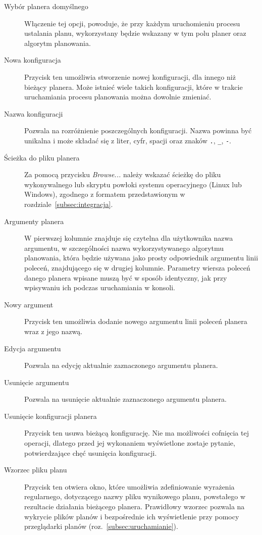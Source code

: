 {
\setcounter{desccount}{1}
\renewcommand{\descriptionlabel}[1]%
{\protect\circled{\arabic{desccount}} \hspace\labelsep\normalfont\bfseries #1\stepcounter{desccount}}

\begin{description}
\item[Wybór planera domyślnego] Włączenie tej opcji, powoduje, że przy każdym uruchomieniu procesu ustalania planu, wykorzystany będzie wskazany w tym polu planer oraz algorytm planowania.
\item [Nowa konfiguracja] Przycisk ten umożliwia stworzenie nowej konfiguracji, dla innego niż bieżący planera. Może istnieć wiele takich konfiguracji, które w trakcie uruchamiania procesu planowania można dowolnie zmieniać.
\item [Nazwa konfiguracji] Pozwala na rozróżnienie poszczególnych konfiguracji. Nazwa powinna być unikalna i może składać się z liter, cyfr, spacji oraz znaków \texttt{.}, \texttt{\_}, \texttt{-}.
\item [Ścieżka do pliku planera] Za pomocą przycisku \emph{Browse...} należy wskazać ścieżkę do pliku wykonywalnego lub skryptu powłoki systemu operacyjnego (Linux lub Windows), zgodnego z formatem przedstawionym w rozdziale~\ref{subsec:integracja}.
\item [Argumenty planera] W pierwszej kolumnie znajduje się czytelna dla użytkownika nazwa argumentu, w szczególności nazwa wykorzystywanego algorytmu planowania, która będzie używana jako prosty odpowiednik argumentu linii poleceń, znajdującego się w drugiej kolumnie. Parametry wiersza poleceń danego planera wpisane muszą być w sposób identyczny, jak przy wpisywaniu ich podczas uruchamiania w konsoli.
\item [Nowy argument] Przycisk ten umożliwia dodanie nowego argumentu linii poleceń planera wraz z jego nazwą.
\item [Edycja argumentu] Pozwala na edycję aktualnie zaznaczonego argumentu planera.
\item [Usunięcie argumentu] Pozwala na usunięcie aktualnie zaznaczonego argumentu planera.
\item [Usunięcie konfiguracji planera] Przycisk ten usuwa bieżącą konfigurację. Nie ma możliwości cofnięcia tej operacji, dlatego przed jej wykonaniem wyświetlone zostaje pytanie, potwierdzające chęć usunięcia konfiguracji.
\item [Wzorzec pliku planu] Przycisk ten otwiera okno, które umożliwia zdefiniowanie wyrażenia regularnego, dotyczącego nazwy pliku wynikowego planu, powstałego w rezultacie działania bieżącego planera. Prawidłowy wzorzec pozwala na wykrycie plików planów i bezpośrednie ich wyświetlenie przy pomocy przeglądarki planów (roz.~\ref{subsec:uruchamianie}).
\end{description}
}


